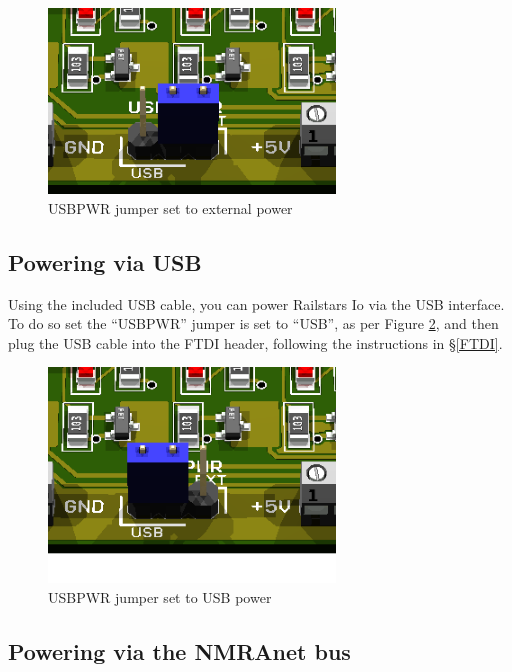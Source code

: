 \documentclass[12pt]{book}
\begin{document}
\begin{figure}[htbp]
\begin{center}
\includegraphics[width=3in]{images/IoUSBPowerEXT.png}
\caption{USBPWR jumper set to external power}
\label{EXTPWR}
\end{center}
\end{figure}

\subsection{Powering via USB}

Using the included USB cable, you can power Railstars Io via the USB interface. To do so set the ``USBPWR'' jumper is set to ``USB'', as per Figure \ref{USBPWR}, and then plug the USB cable into the FTDI header, following the instructions in \S\ref{FTDI}.

\begin{figure}[htbp]
\begin{center}
\includegraphics[width=3in]{images/IoUSBPowerUSB.png}
\caption{USBPWR jumper set to USB power}
\label{USBPWR}
\end{center}
\end{figure}

\subsection{Powering via the NMRAnet bus}
\end{document}
